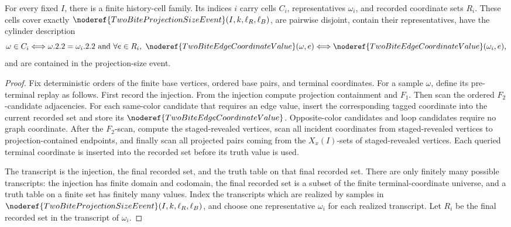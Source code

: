 \begin{helper}
For every fixed \(I\), there is a finite history-cell family.  Its indices
\(i\) carry cells \(C_i\), representatives \(\omega_i\), and recorded
coordinate sets \(R_i\).  These cells cover exactly
\(\noderef{TwoBiteProjectionSizeEvent}(I,k,\ell_R,\ell_B)\), are pairwise
disjoint, contain their representatives, have the cylinder description
\[
\omega\in C_i
\Longleftrightarrow
\omega.2.2=\omega_i.2.2
\text{ and }
\forall e\in R_i,\ 
\noderef{TwoBiteEdgeCoordinateValue}(\omega,e)
\Longleftrightarrow
\noderef{TwoBiteEdgeCoordinateValue}(\omega_i,e),
\]
and are contained in the projection-size event.
\end{helper}
\begin{proof}
Fix deterministic orders of the finite base vertices, ordered base pairs, and
terminal coordinates.  For a sample \(\omega\), define its pre-terminal replay
as follows.  First record the injection.  From the injection compute projection
containment and \(F_1\).  Then scan the ordered \(F_2\)-candidate adjacencies.
For each same-color candidate that requires an edge value, insert the
corresponding tagged coordinate into the current recorded set and store its
\(\noderef{TwoBiteEdgeCoordinateValue}\).  Opposite-color candidates and loop
candidates require no graph coordinate.  After the \(F_2\)-scan, compute the
staged-revealed vertices, scan all incident coordinates from staged-revealed
vertices to projection-contained endpoints, and finally scan all projected
pairs coming from the \(X_x(I)\)-sets of staged-revealed vertices.  Each
queried terminal coordinate is inserted into the recorded set before its truth
value is used.

The transcript is the injection, the final recorded set, and the truth table
on that final recorded set.  There are only finitely many possible
transcripts: the injection has finite domain and codomain, the final recorded
set is a subset of the finite terminal-coordinate universe, and a truth table
on a finite set has finitely many values.  Index the transcripts which are
realized by samples in
\(\noderef{TwoBiteProjectionSizeEvent}(I,k,\ell_R,\ell_B)\), and choose one
representative \(\omega_i\) for each realized transcript.  Let \(R_i\) be the
final recorded set in the transcript of \(\omega_i\).


\end{proof}
